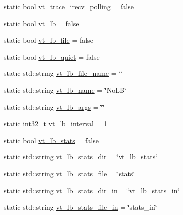 \begin{DoxyCompactItemize}
\item 
static bool \hyperlink{structvt_1_1arguments_1_1_arg_config_aa6b37855e6e490e24a0aeb26125a7d1b}{vt\+\_\+trace\+\_\+irecv\+\_\+polling} = false
\item 
static bool \hyperlink{structvt_1_1arguments_1_1_arg_config_aab51ec67928526875a458f982e5fa90c}{vt\+\_\+lb} = false
\item 
static bool \hyperlink{structvt_1_1arguments_1_1_arg_config_a970d5784bfb69a34a04ec393fcd41cf6}{vt\+\_\+lb\+\_\+file} = false
\item 
static bool \hyperlink{structvt_1_1arguments_1_1_arg_config_ab0a9812811750643510b00fb7c0651a5}{vt\+\_\+lb\+\_\+quiet} = false
\item 
static std\+::string \hyperlink{structvt_1_1arguments_1_1_arg_config_adadeb5ba97bec396d11b5c856736bd3e}{vt\+\_\+lb\+\_\+file\+\_\+name} = \char`\"{}\char`\"{}
\item 
static std\+::string \hyperlink{structvt_1_1arguments_1_1_arg_config_a856cdf90d67403a08574e5a7a3ca792c}{vt\+\_\+lb\+\_\+name} = \char`\"{}No\+LB\char`\"{}
\item 
static std\+::string \hyperlink{structvt_1_1arguments_1_1_arg_config_aa9c190d04d0c6f9b3dac4ac56ac1a721}{vt\+\_\+lb\+\_\+args} = \char`\"{}\char`\"{}
\item 
static int32\+\_\+t \hyperlink{structvt_1_1arguments_1_1_arg_config_a273268a11a1525ad3754c72f5e6494b3}{vt\+\_\+lb\+\_\+interval} = 1
\item 
static bool \hyperlink{structvt_1_1arguments_1_1_arg_config_adf22250e9e2d60c5c57f41b8050f4697}{vt\+\_\+lb\+\_\+stats} = false
\item 
static std\+::string \hyperlink{structvt_1_1arguments_1_1_arg_config_a279d3953c475ea80bac06e2ed5ba6b5f}{vt\+\_\+lb\+\_\+stats\+\_\+dir} = \char`\"{}vt\+\_\+lb\+\_\+stats\char`\"{}
\item 
static std\+::string \hyperlink{structvt_1_1arguments_1_1_arg_config_ad6c76c8ec1dd43338a10f35929ce53f7}{vt\+\_\+lb\+\_\+stats\+\_\+file} = \char`\"{}stats\char`\"{}
\item 
static std\+::string \hyperlink{structvt_1_1arguments_1_1_arg_config_a2db08bf2d315dad981aaa9f5f79d31a5}{vt\+\_\+lb\+\_\+stats\+\_\+dir\+\_\+in} = \char`\"{}vt\+\_\+lb\+\_\+stats\+\_\+in\char`\"{}
\item 
static std\+::string \hyperlink{structvt_1_1arguments_1_1_arg_config_a7b294f12d448dcfe20f418db26a509bf}{vt\+\_\+lb\+\_\+stats\+\_\+file\+\_\+in} = \char`\"{}stats\+\_\+in\char`\"{}
\item 

\end{DoxyCompactItemize}
